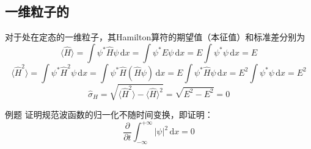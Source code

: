 \subsection{一维粒子的}
对于处在定态的一维粒子，其Hamilton算符的期望值（本征值）和标准差分别为
$$
    \langle\hat{H}\rangle=\int\psi^*\hat{H}\psi\,\mathrm{d}x=\int\psi^*E\psi\,\mathrm{d}x=E\int\psi^*\psi\,\mathrm{d}x=E
$$
$$
    \langle\hat{H}^2\rangle
    =\int\psi^*\hat{H}^2\psi\,\mathrm{d}x
    =\int\psi^*\hat{H}(\hat{H}\psi)\,\mathrm{d}x
    =E\int\psi^*\hat{H}\psi\,\mathrm{d}x
    =E^2\int\psi^*\psi\,\mathrm{d}x
    =E^2
$$
$$
    \hat{\sigma}_{H}
    =\sqrt{\langle\hat{H}^2\rangle-\langle\hat{H}\rangle^2}
    =\sqrt{E^2-E^2}
    =0
$$
\begin{question}{例题}
    证明规范波函数的归一化不随时间变换，即证明：
    $$
        \frac{\partial }{\partial t}\int_{-\infty}^{+\infty}|\psi|^2 \,\mathrm{d}x=0
    $$
\end{question}
